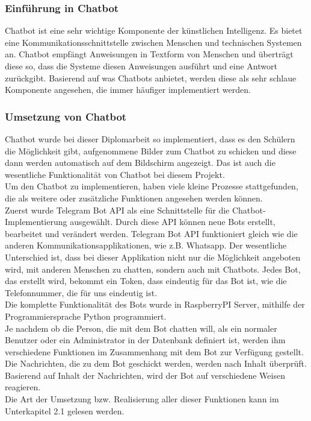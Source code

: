 \subsubsection{Einführung in Chatbot}
Chatbot ist eine sehr wichtige Komponente der künstlichen Intelligenz. Es bietet eine Kommunikationsschnittstelle zwischen Menschen und technischen Systemen an. Chatbot empfängt Anweisungen in Textform von Menschen und überträgt diese so, dass die Systeme diesen Anweisungen ausführt und eine Antwort zurückgibt. Basierend auf was Chatbots anbietet, werden diese als sehr schlaue Komponente angesehen, die immer häufiger implementiert werden.
\subsubsection{Umsetzung von Chatbot}
Chatbot wurde bei dieser Diplomarbeit so implementiert, dass es den Schülern die Möglichkeit gibt, aufgenommene Bilder zum Chatbot zu schicken und diese dann werden automatisch auf dem Bildschirm angezeigt. Das ist auch die wesentliche Funktionalität von Chatbot bei diesem Projekt. \\
Um den Chatbot zu implementieren, haben viele kleine Prozesse stattgefunden, die als weitere oder zusätzliche Funktionen angesehen werden können.\\
Zuerst wurde Telegram Bot API als eine Schnittstelle für die Chatbot-Implementierung ausgewählt. Durch diese API können neue Bots erstellt, bearbeitet und verändert werden. Telegram Bot API funktioniert gleich wie die anderen Kommunikationsapplikationen, wie z.B. Whatsapp. Der wesentliche Unterschied ist, dass bei dieser Applikation nicht nur die Möglichkeit angeboten wird, mit anderen Menschen zu chatten, sondern auch mit Chatbots. Jedes Bot, das erstellt wird, bekommt ein Token, dass eindeutig für das Bot ist, wie die Telefonnummer, die für uns eindeutig ist. \\
Die komplette Funktionalität des Bots wurde in RaspberryPI Server, mithilfe der Programmiersprache Python programmiert. \\
Je nachdem ob die Person, die mit dem Bot chatten will, als ein normaler Benutzer oder ein Administrator in der Datenbank definiert ist, werden ihm verschiedene Funktionen im Zusammenhang mit dem Bot zur Verfügung gestellt. Die Nachrichten, die zu dem Bot geschickt werden, werden nach Inhalt überprüft. Basierend auf Inhalt der Nachrichten, wird der Bot auf verschiedene Weisen reagieren.\\
Die Art der Umsetzung bzw. Realisierung aller dieser Funktionen kann im Unterkapitel 2.1 gelesen werden.   

